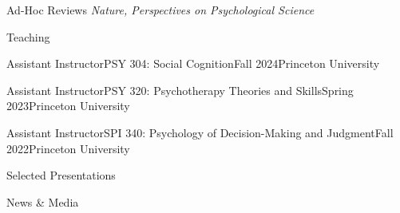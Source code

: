\documentclass{cv} %
\begin{document}
\newpage


\begin{cvSectionEmpty}{Ad-Hoc Reviews}
  \textit{Nature, Perspectives on Psychological Science}
\end{cvSectionEmpty}


\begin{cvSection}{Teaching}
  \begin{cvSubsectionTeaching}{Assistant Instructor}{PSY 304: Social Cognition}{Fall 2024}{Princeton University}
  \end{cvSubsectionTeaching}

  \begin{cvSubsectionTeaching}{Assistant Instructor}{PSY 320: Psychotherapy Theories and Skills}{Spring 2023}{Princeton University}
  \end{cvSubsectionTeaching}

  \begin{cvSubsectionTeaching}{Assistant Instructor}{SPI 340: Psychology of Decision-Making and Judgment}{Fall 2022}{Princeton University}
  \end{cvSubsectionTeaching}
\end{cvSection}



\begin{cvSectionEmpty}{Selected Presentations}
  \printbibliography[
    heading=none,
    keyword=selected-talks
  ]
\end{cvSectionEmpty}


\begin{cvSectionEmpty}{News \& Media}
  \printbibliography[heading=none, keyword=media]
\end{cvSectionEmpty}
\end{document}

